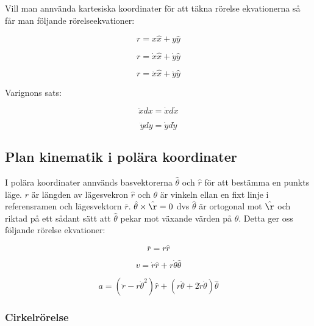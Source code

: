 \documentclass[a4paper,12pt]{article}
\begin{document}
Vill man annvända kartesiska koordinater för att täkna rörelse ekvationerna så får man 
följande rörelseekvationer:

\begin{equation}
r = x\hat{x} + y\hat{y}
\end{equation}

\begin{equation}
r = \dot{x}\hat{x} + \dot{y}\hat{y}
\end{equation}

\begin{equation}
r = \ddot{x}\hat{x} + \ddot{y}\hat{y}
\end{equation}

Varignons sats:

\begin{equation}
\ddot{x}dx = \dot{x}d\dot{x}
\end{equation}

\begin{equation}
\ddot{y}dy = \dot{y}d\dot{y}
\end{equation}

\subsection{Plan kinematik i polära koordinater}
I polära koordinater annvänds basvektorerna 
$\hat{\theta}$ och $\hat{r}$ för att bestämma en punkts läge. 
$r$ är längden av lägesvekron $\hat{r}$ och $\theta$ är vinkeln 
ellan en fixt linje i referensramen och lägesvektorn $\bar{r}$. 
$\hat{\theta} \times \hat{\r}= 0$ dvs $\hat{\theta}$  är 
ortogonal mot $\hat{\r}$ och riktad på ett sådant sätt att
$\hat{\theta}$ pekar mot växande värden på $\theta$.
Detta ger oss följande rörelse ekvationer:

\begin{equation}
\bar{r}=r\hat{r}
\end{equation}

\begin{equation}
v = \dot{r}\hat{r} + r\dot{\theta}\hat{\theta}
\end{equation}

\begin{equation}
a = (\ddot{r}-r\dot{\theta}^2)\hat{r}+(r\ddot{\theta}+2\dot{r}\dot{\theta})\hat{\theta}
\end{equation}

\subsubsection{Cirkelrörelse}
\end{document}
